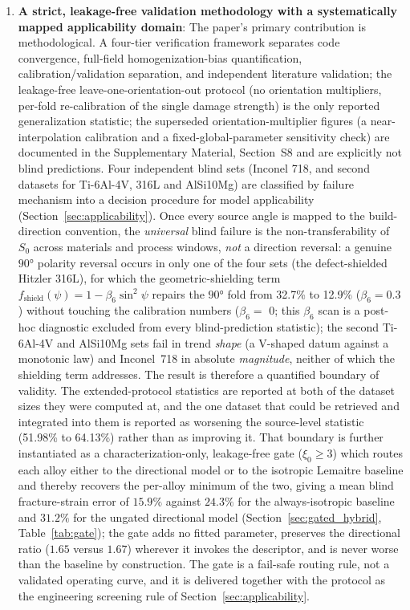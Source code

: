 \begin{enumerate}\def\labelenumi{(\arabic{enumi})}
    \item \textbf{A strict, leakage-free validation methodology with a systematically mapped applicability domain}: The paper's primary contribution is methodological. A four-tier verification framework separates code convergence, full-field homogenization-bias quantification, calibration/validation separation, and independent literature validation; the leakage-free leave-one-orientation-out protocol (no orientation multipliers, per-fold re-calibration of the single damage strength) is the only reported generalization statistic; the superseded orientation-multiplier figures (a near-interpolation calibration and a fixed-global-parameter sensitivity check) are documented in the Supplementary Material, Section~S8 and are explicitly not blind predictions. Four independent blind sets (Inconel 718, and second datasets for Ti-6Al-4V, 316L and AlSi10Mg) are classified by failure mechanism into a decision procedure for model applicability (Section~\ref{sec:applicability}). Once every source angle is mapped to the build-direction convention, the \emph{universal} blind failure is the non-transferability of $S_0$ across materials and process windows, \emph{not} a direction reversal: a genuine $\ang{90}$ polarity reversal occurs in only one of the four sets (the defect-shielded Hitzler 316L), for which the geometric-shielding term $f_{\text{shield}}(\psi) = 1 - \beta_6 \sin^2\psi$ repairs the $\ang{90}$ fold from 32.7\% to 12.9\% ($\beta_6 = 0.3$) without touching the calibration numbers ($\beta_6 = $ 0; this $\beta_6$ scan is a post-hoc diagnostic excluded from every blind-prediction statistic); the second Ti-6Al-4V and AlSi10Mg sets fail in trend \emph{shape} (a V-shaped datum against a monotonic law) and Inconel~718 in absolute \emph{magnitude}, neither of which the shielding term addresses. The result is therefore a quantified boundary of validity. The extended-protocol statistics are reported at both of the dataset sizes they were computed at, and the one dataset that could be retrieved and integrated into them is reported as worsening the source-level statistic (51.98\% to 64.13\%) rather than as improving it. That boundary is further instantiated as a characterization-only, leakage-free gate ($\xi_0\ge3$) which routes each alloy either to the directional model or to the isotropic Lemaitre baseline and thereby recovers the per-alloy minimum of the two, giving a mean blind fracture-strain error of $15.9\%$ against $24.3\%$ for the always-isotropic baseline and $31.2\%$ for the ungated directional model (Section~\ref{sec:gated_hybrid}, Table~\ref{tab:gate}); the gate adds no fitted parameter, preserves the directional ratio ($1.65$ versus $1.67$) wherever it invokes the descriptor, and is never worse than the baseline by construction. The gate is a fail-safe routing rule, not a validated operating curve, and it is delivered together with the protocol as the engineering screening rule of Section~\ref{sec:applicability}.
    

\end{enumerate}
